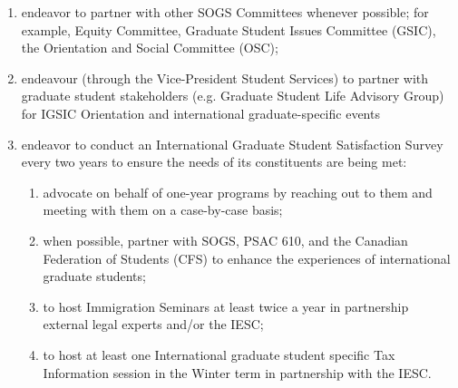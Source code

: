 \begin{enumerate}[label*=\arabic*., align=left]
\begin{enumerate}[label*=\arabic*., align=left]
\item endeavor to partner with other SOGS Committees whenever possible; for example, Equity Committee, Graduate Student Issues Committee (GSIC), the Orientation and Social Committee (OSC);
\item endeavour (through the Vice-President Student Services) to partner with graduate student stakeholders (e.g. Graduate Student Life Advisory Group) for IGSIC Orientation and international graduate-specific events
\item endeavor to conduct an International Graduate Student Satisfaction Survey every two years to ensure the needs of its constituents are being met:
\begin{enumerate}[label*=\arabic*., align=left]
\item advocate on behalf of one-year programs by reaching out to them and meeting with them on a case-by-case basis;
\item when possible, partner with SOGS, PSAC 610, and the Canadian Federation of Students (CFS) to enhance the experiences of international graduate students;
\item to host Immigration Seminars at least twice a year in partnership external legal experts and/or the IESC;
\item to host at least one International graduate student specific Tax Information session in the Winter term in partnership with the IESC.
\end{enumerate}
\end{enumerate}
\end{enumerate}